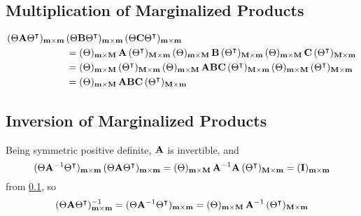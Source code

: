 \documentclass[a4paper, margin=1in, reqno]{RAMArticle}
\begin{document}
	\subsection{Multiplication of Marginalized Products}\label{sub:App:MMP}
		\begin{align*}
			(\Theta\mathbf{A}\Theta^{\intercal})_{\mathbf{m}\times\mathbf{m}}\,&(\Theta\mathbf{B}\Theta^{\intercal})_{\mathbf{m}\times\mathbf{m}}
			\,(\Theta\mathbf{C}\Theta^{\intercal})_{\mathbf{m}\times\mathbf{m}}\\
			&= 
			(\Theta)_{\mathbf{m}\times\mathbf{M}}\,\mathbf{A}\,(\Theta^{\intercal})_{\mathbf{M}\times\mathbf{m}}\,
			(\Theta)_{\mathbf{m}\times\mathbf{M}}\,\mathbf{B}\,(\Theta^{\intercal})_{\mathbf{M}\times\mathbf{m}}\,
			(\Theta)_{\mathbf{m}\times\mathbf{M}}\,\mathbf{C}\,(\Theta^{\intercal})_{\mathbf{M}\times\mathbf{m}} \\
			&= 
			(\Theta)_{\mathbf{m}\times\mathbf{M}}\,(\Theta^{\intercal})_{\mathbf{M}\times\mathbf{m}}\,
			(\Theta)_{\mathbf{m}\times\mathbf{M}}\,\mathbf{A}\mathbf{B}\mathbf{C}\,(\Theta^{\intercal})_{\mathbf{M}\times\mathbf{m}}\,
			(\Theta)_{\mathbf{m}\times\mathbf{M}}\,(\Theta^{\intercal})_{\mathbf{M}\times\mathbf{m}} \\
			&= 
			(\Theta)_{\mathbf{m}\times\mathbf{M}}\,\mathbf{A}\mathbf{B}\mathbf{C}\,(\Theta^{\intercal})_{\mathbf{M}\times\mathbf{m}}\,
		\end{align*}

	\subsection{Inversion of Marginalized Products}\label{sub:App:IMP}
		Being symmetric positive definite, \(\mathbf{A}\) is invertible, and
		\begin{equation*}
			(\Theta\mathbf{A}^{-1}\Theta^{\intercal})_{\mathbf{m}\times\mathbf{m}}\,(\Theta\mathbf{A}\Theta^{\intercal})_{\mathbf{m}\times\mathbf{m}}
			= (\Theta)_{\mathbf{m}\times\mathbf{M}}\,\mathbf{A}^{-1}\mathbf{A}\,(\Theta^{\intercal})_{\mathbf{M}\times\mathbf{m}}
			= (\mathbf{I})_{\mathbf{m}\times\mathbf{m}}
		\end{equation*}
		from \cref{sub:App:MMP}, so
		\begin{equation*}
			(\Theta\mathbf{A}\Theta^{\intercal})_{\mathbf{m}\times\mathbf{m}}^{-1}
			= (\Theta\mathbf{A}^{-1}\Theta^{\intercal})_{\mathbf{m}\times\mathbf{m}}
			= (\Theta)_{\mathbf{m}\times\mathbf{M}}\,\mathbf{A}^{-1}\,(\Theta^{\intercal})_{\mathbf{M}\times\mathbf{m}}
		\end{equation*}
	
\end{document}
